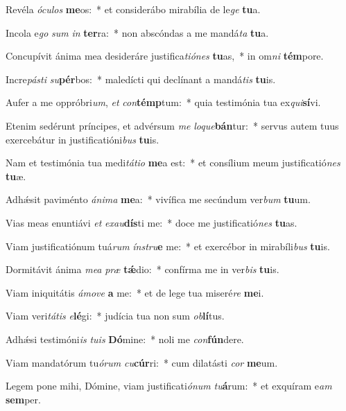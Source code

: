 \item Revéla \textit{ó}\textit{cu}\textit{los} \textbf{me}os:~* et considerábo mirabília de le\textit{ge} \textbf{tu}a.
\item Incola e\textit{go} \textit{sum} \textit{in} \textbf{ter}ra:~* non abscóndas a me mandá\textit{ta} \textbf{tu}a.
\item Concupívit ánima mea desideráre justifica\textit{ti}\textit{ó}\textit{nes} \textbf{tu}as,~* in om\textit{ni} \textbf{tém}pore.
\item Incre\textit{pás}\textit{ti} \textit{su}\textbf{pér}bos:~* maledícti qui declínant a mandá\textit{tis} \textbf{tu}is.
\item Aufer a me oppróbri\textit{um}, \textit{et} \textit{con}\textbf{témp}tum:~* quia testimónia tua ex\textit{qui}\textbf{sí}vi.
\item Etenim sedérunt príncipes, et advérsum \textit{me} \textit{lo}\textit{que}\textbf{bán}tur:~* servus autem tuus exercebátur in justificatióni\textit{bus} \textbf{tu}is.
\item Nam et testimónia tua medi\textit{tá}\textit{ti}\textit{o} \textbf{me}a est:~* et consílium meum justificatió\textit{nes} \textbf{tu}æ.
\item Adhǽsit paviménto \textit{á}\textit{ni}\textit{ma} \textbf{me}a:~* vivífica me secúndum ver\textit{bum} \textbf{tu}um.
\item Vias meas enuntiávi \textit{et} \textit{ex}\textit{au}\textbf{dís}ti me:~* doce me justificatió\textit{nes} \textbf{tu}as.
\item Viam justificatiónum tuá\textit{rum} \textit{ín}\textit{stru}\textbf{e} me:~* et exercébor in mirabíli\textit{bus} \textbf{tu}is.
\item Dormitávit ánima \textit{me}\textit{a} \textit{præ} \textbf{tǽ}dio:~* confírma me in ver\textit{bis} \textbf{tu}is.
\item Viam iniquitátis \textit{á}\textit{mo}\textit{ve} \textbf{a} me:~* et de lege tua miseré\textit{re} \textbf{me}i.
\item Viam veri\textit{tá}\textit{tis} \textit{e}\textbf{lé}gi:~* judícia tua non sum \textit{ob}\textbf{lí}tus.
\item Adhǽsi testimóni\textit{is} \textit{tu}\textit{is} \textbf{Dó}mine:~* noli me \textit{con}\textbf{fún}dere.
\item Viam mandatórum tu\textit{ó}\textit{rum} \textit{cu}\textbf{cúr}ri:~* cum dilatásti \textit{cor} \textbf{me}um.
\item Legem pone mihi, Dómine, viam justificati\textit{ó}\textit{num} \textit{tu}\textbf{á}rum:~* et exquíram e\textit{am} \textbf{sem}per.

